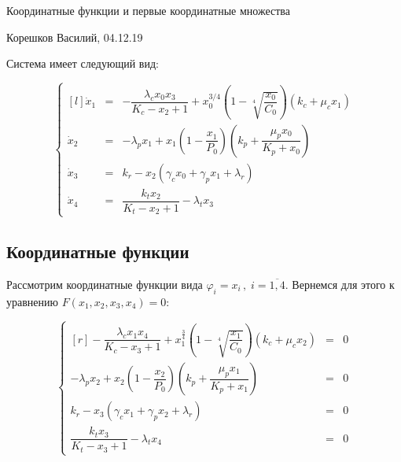 \documentclass[12pt,a4paper]{article}
\begin{document}
\begin{center}
    \large Координатные функции и первые координатные множества
\end{center}
\begin{flushright}
    Корешков Василий, 04.12.19
\end{flushright}

{\large Система имеет следующий вид:}

\begin{equation}
    \left\{
    \begin{matrix*}[l]
    \dot{x}_1 & = & - \dfrac{\lambda_{c} x_{0} x_{3}}{K_{c} - x_{2} + 1} + x_{0}^{3/4} \left(1 - \sqrt[4]{\dfrac{x_{0}}{C_{0}}}\right) \left(k_{c} + \mu_{c} x_{1}\right)
    \\
    \dot{x}_2 & = & - \lambda_{p} x_{1} + x_{1} \left(1 - \dfrac{x_{1}}{P_{0}}\right) \left(k_{p} + \dfrac{\mu_{p} x_{0}}{K_{p} + x_{0}}\right)
    \\
    \dot{x}_3 & = & k_{r} - x_{2} \left(\gamma_{c} x_{0} + \gamma_{p} x_{1} + \lambda_{r}\right)
    \\
    \dot{x}_4 & = & \dfrac{k_{t} x_{2}}{K_{t} - x_{2} + 1} - \lambda_{t} x_{3}
    \end{matrix*}
    \right.
\end{equation}

\subsection{Координатные функции}

Рассмотрим координатные функции вида
\(\varphi_i = x_i\,,\; i = \overline{1,4}.\) Вернемся для этого к
уравнению \(F(x_1,x_2,x_3,x_4) = 0:\)


\begin{equation*}
    \left\{
        \begin{matrix*}[r]
            - \dfrac{\lambda_{c} x_{1} x_{4}}{K_{c} - x_{3} + 1} + x_{1}^{\frac{3}{4}} \left(1 - \sqrt[4]{\dfrac{x_{1}}{C_{0}}}\right) \left(k_{c} + \mu_{c} x_{2}\right) &=& 0
            \\
            - \lambda_{p} x_{2} + x_{2} \left(1 - \dfrac{x_{2}}{P_{0}}\right) \left(k_{p} + \dfrac{\mu_{p} x_{1}}{K_{p} + x_{1}}\right) &=&  0
            \\
            k_{r} - x_{3} \left(\gamma_{c} x_{1} + \gamma_{p} x_{2} + \lambda_{r}\right) &=& 0
            \\
            \dfrac{k_{t} x_{3}}{K_{t} - x_{3} + 1} - \lambda_{t} x_{4} &=& 0
        \end{matrix*}
    \right.
\end{equation*}
\end{document}
